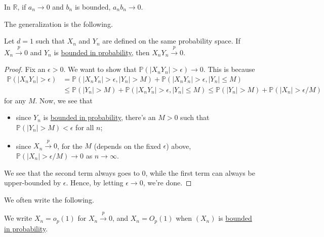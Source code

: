 \begin{prev}
	In \(\mathbb{R} \), if \(a_n \to 0\) and \(b_n\) is bounded, \(a_n b_n \to 0\).
\end{prev}

The generalization is the following.

\begin{proposition}\label{prop:lec6}
	Let \(d = 1\) such that \(X_n\) and \(Y_n\) are defined on the same probability space. If \(X_n \overset{p}{\to } 0\) and \(Y_n\) is \hyperref[def:bounded-in-probability]{bounded in probability}, then \(X_n Y_n \overset{p}{\to } 0\).
\end{proposition}
\begin{proof}
	Fix an \(\epsilon > 0\). We want to show that \(\mathbb{P} (\vert X_n Y_n \vert > \epsilon ) \to 0\). This is because
	\[
		\begin{split}
			\mathbb{P} (\vert X_n Y_n \vert > \epsilon )
			 & = \mathbb{P} (\vert X_n Y_n \vert > \epsilon , \vert Y_n \vert > M) + \mathbb{P} (\vert X_n Y_n \vert > \epsilon , \vert Y_n \vert \leq M) \\
			 & \leq \mathbb{P} (\vert Y_n \vert > M) + \mathbb{P} (\vert X_n Y_n \vert > \epsilon , \vert Y_n \vert \leq M)
			\leq \mathbb{P} (\vert Y_n \vert > M ) + \mathbb{P} (\vert X_n \vert > \epsilon / M)
		\end{split}
	\]
	for any \(M\). Now, we see that
	\begin{itemize}
		\item since \(Y_n\) is \hyperref[def:bounded-in-probability]{bounded in probability}, there's an \(M > 0\) such that \(\mathbb{P} (\vert Y_n \vert > M) < \epsilon \) for all \(n\);
		\item since \(X_n \overset{p}{\to } 0\), for the \(M\) (depends on the fixed \(\epsilon \)) above, \(\mathbb{P} (\vert X_n \vert > \epsilon / M) \to 0\) as \(n \to \infty \).
	\end{itemize}
	We see that the second term always goes to \(0\), while the first term can always be upper-bounded by \(\epsilon \). Hence, by letting \(\epsilon \to 0\), we're done.
\end{proof}

We often write the following.

\begin{notation}
	We write \(X_n = o_p(1)\) for \(X_n \overset{p}{\to } 0\), and \(X_n = O_p(1)\) when \((X_n)\) is \hyperref[def:bounded-in-probability]{bounded in probability}.
\end{notation}

